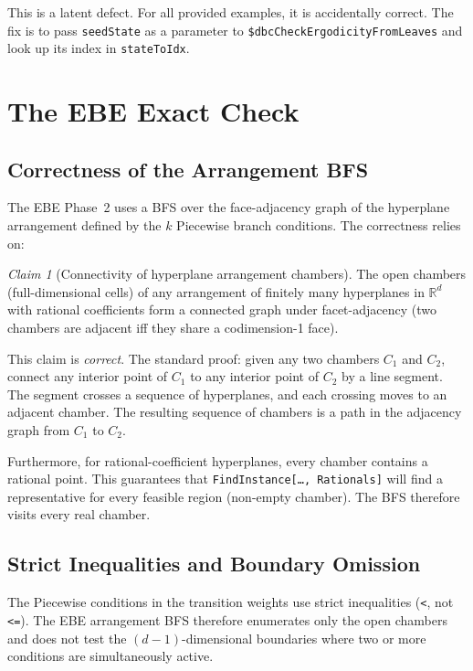 \documentclass[12pt,a4paper]{article}
\theoremstyle{critical}
\theoremstyle{remark}
\newtheorem{claim}{Claim}
\begin{document}
This is a latent defect. For all provided examples, it is accidentally correct. The fix
is to pass \texttt{seedState} as a parameter to \texttt{\$dbcCheckErgodicityFromLeaves}
and look up its index in \texttt{stateToIdx}.

\section{The EBE Exact Check}
\label{sec:ebe}

\subsection{Correctness of the Arrangement BFS}

The EBE Phase~2 uses a BFS over the face-adjacency graph of the hyperplane arrangement
defined by the $k$ Piecewise branch conditions. The correctness relies on:

\begin{claim}[Connectivity of hyperplane arrangement chambers]
The open chambers (full-dimensional cells) of any arrangement of finitely many
hyperplanes in $\mathbb{R}^d$ with rational coefficients form a connected graph under
facet-adjacency (two chambers are adjacent iff they share a codimension-1 face).
\end{claim}

This claim is \emph{correct}. The standard proof: given any two chambers $C_1$ and
$C_2$, connect any interior point of $C_1$ to any interior point of $C_2$ by a line
segment. The segment crosses a sequence of hyperplanes, and each crossing moves to an
adjacent chamber. The resulting sequence of chambers is a path in the adjacency graph
from $C_1$ to $C_2$.

Furthermore, for rational-coefficient hyperplanes, every chamber contains a rational
point. This guarantees that \texttt{FindInstance[\ldots, Rationals]} will find a
representative for every feasible region (non-empty chamber). The BFS therefore visits
every real chamber.

\subsection{Strict Inequalities and Boundary Omission}

The Piecewise conditions in the transition weights use strict inequalities
(\texttt{<}, not \texttt{<=}). The EBE arrangement BFS therefore enumerates only the
open chambers and does not test the $(d-1)$-dimensional boundaries where two or more
conditions are simultaneously active.
\end{document}
